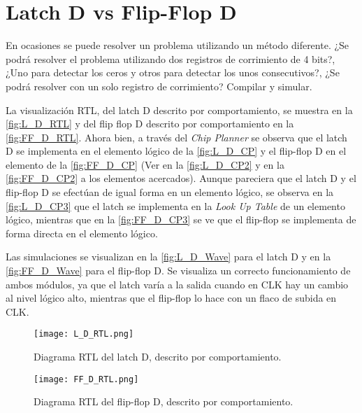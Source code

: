 \section{Latch D vs Flip-Flop D \label{sec:s4}}

\begin{center}
	\begin{minipage}{12cm}
		\begin{tcolorbox}[title=Actividad 4]
			En ocasiones se puede resolver un problema utilizando un método diferente. ¿Se podrá resolver el problema utilizando dos registros de corrimiento de 4 bits?, ¿Uno para detectar los ceros y otros para detectar los unos consecutivos?, ¿Se podrá resolver con un solo registro de corrimiento? Compilar y simular.
		\end{tcolorbox}	
	\end{minipage}
\end{center}

La visualización RTL, del latch D descrito por comportamiento, se muestra en la \autoref{fig:L_D_RTL} y del flip flop D descrito por comportamiento en la \autoref{fig:FF_D_RTL}. Ahora bien, a través del \textit{Chip Planner} se observa que el latch D se implementa en el elemento lógico de la \autoref{fig:L_D_CP} y el flip-flop D en el elemento de la \autoref{fig:FF_D_CP} (Ver en la \autoref{fig:L_D_CP2} y en la \autoref{fig:FF_D_CP2} a los elementos acercados). Aunque pareciera que el latch D y el flip-flop D se efectúan de igual forma en un elemento lógico, se observa en la \autoref{fig:L_D_CP3} que el latch se implementa en la \textit{Look Up Table} de un elemento lógico, mientras que en la \autoref{fig:FF_D_CP3} se ve que el flip-flop se implementa de forma directa en el elemento lógico.

Las simulaciones se visualizan en la \autoref{fig:L_D_Wave} para el latch D y en la \autoref{fig:FF_D_Wave} para el flip-flop D. Se visualiza un correcto funcionamiento de ambos módulos, ya que el latch varía a la salida cuando en CLK hay un cambio al nivel lógico alto, mientras que el flip-flop lo hace con un flaco de subida en CLK.

\begin{figure}[ht]
	\centering
	\texttt{[image: L\_D\_RTL.png]}
	\caption{Diagrama RTL del latch D, descrito por comportamiento. \label{fig:L_D_RTL}}
\end{figure}

\begin{figure}[ht]
	\centering
	\texttt{[image: FF\_D\_RTL.png]}
	\caption{Diagrama RTL del flip-flop D, descrito por comportamiento. \label{fig:FF_D_RTL}}
\end{figure}


